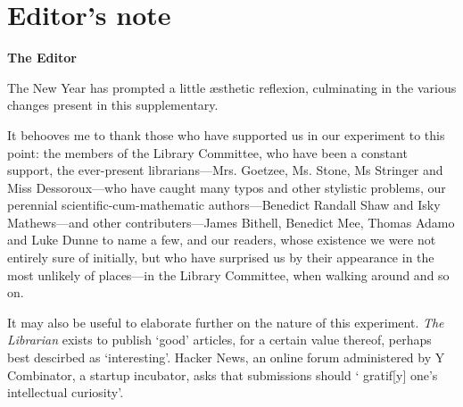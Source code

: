 \chapter{Editor's note}

\textbf{The Editor}

\begin{multicols}{2}

The New Year has prompted a little æsthetic reflexion, culminating in the various changes present in this supplementary.

It behooves me to thank those who have supported us in our experiment to this point: the members of the Library Committee, who have been a constant support, the ever-present librarians---Mrs. Goetzee, Ms. Stone, Ms Stringer and Miss Dessoroux---who have caught many typos and other stylistic problems, our perennial scientific-cum-mathematic authors---Benedict Randall Shaw and Isky Mathews---and other contributers---James Bithell, Benedict Mee, Thomas Adamo and Luke Dunne to name a few, and our readers, whose existence we were not entirely sure of initially, but who have surprised us by their appearance in the most unlikely of places---in the Library Committee, when walking around and so on.

It may also be useful to elaborate further on the nature of this experiment. \textit{The Librarian} exists to publish `good' articles, for a certain value thereof, perhaps best descirbed as `interesting'. Hacker News, an online forum administered by Y Combinator, a startup incubator, asks that submissions should ` gratif[y] one's intellectual curiosity'.

\end{multicols}